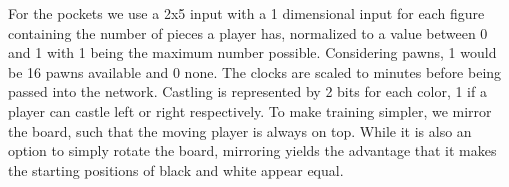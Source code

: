 For the pockets we use a 2x5 input with a 1 dimensional input for each figure containing the number of pieces a player has, normalized to a value between 0 and 1 with 1 being the maximum number possible.
Considering pawns, 1 would be 16 pawns available and 0 none.
The clocks are scaled to minutes before being passed into the network.
Castling is represented by 2 bits for each color, 1 if a player can castle left or right respectively.
To make training simpler, we mirror the board, such that the moving player is always on top.
While it is also an option to simply rotate the board, mirroring yields the advantage that it makes the starting positions of black and white appear equal.
